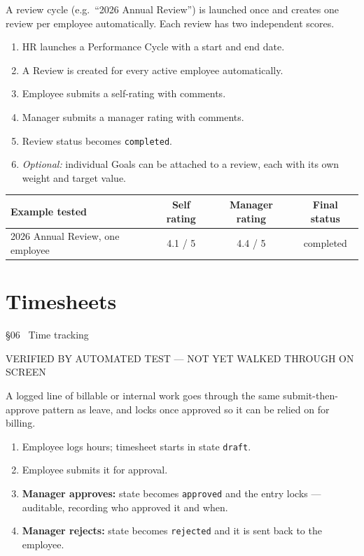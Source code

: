 \documentclass[11pt,a4paper]{article}
\newcommand{\eyebrow}[1]{{\small\ttfamily\color{accentdark} #1}\par\vspace{2pt}}
\begin{document}
A review cycle (e.g.\ ``2026 Annual Review'') is launched once and creates one review per employee automatically. Each review has two independent scores.

\begin{enumerate}[leftmargin=1.8em]
  \item HR launches a Performance Cycle with a start and end date.
  \item A Review is created for every active employee automatically.
  \item Employee submits a self-rating with comments.
  \item Manager submits a manager rating with comments.
  \item Review status becomes \texttt{completed}.
  \item \emph{Optional:} individual Goals can be attached to a review, each with its own weight and target value.
\end{enumerate}

\begin{center}
\small
\begin{tabular}{@{}lccc@{}}
\toprule
\textbf{Example tested} & \textbf{Self rating} & \textbf{Manager rating} & \textbf{Final status} \\
\midrule
2026 Annual Review, one employee & 4.1 / 5 & 4.4 / 5 & completed \\
\bottomrule
\end{tabular}
\end{center}

\section{Timesheets}
\eyebrow{\S06 \textperiodcentered\ Time tracking}
\begin{statusbox}{VERIFIED BY AUTOMATED TEST --- NOT YET WALKED THROUGH ON SCREEN}\end{statusbox}

A logged line of billable or internal work goes through the same submit-then-approve pattern as leave, and locks once approved so it can be relied on for billing.

\begin{enumerate}[leftmargin=1.8em]
  \item Employee logs hours; timesheet starts in state \texttt{draft}.
  \item Employee submits it for approval.
  \item \textbf{Manager approves:} state becomes \texttt{approved} and the entry locks --- auditable, recording who approved it and when.
  \item \textbf{Manager rejects:} state becomes \texttt{rejected} and it is sent back to the employee.
\end{enumerate}
\end{document}
